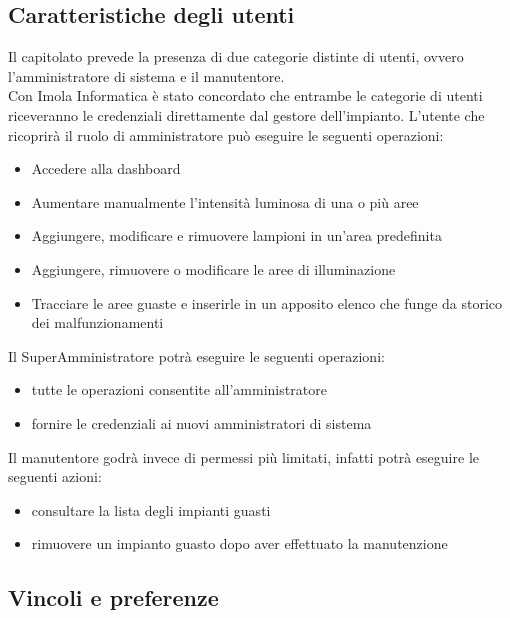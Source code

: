 \documentclass[12pt]{article}
\begin{document}
\subsection{Caratteristiche degli utenti}
Il capitolato prevede la presenza di due categorie distinte di utenti, ovvero l'amministratore di sistema e il manutentore. \\
Con Imola Informatica è stato concordato che entrambe le categorie di utenti riceveranno le credenziali direttamente dal gestore dell'impianto.
L'utente che ricoprirà il ruolo di amministratore può eseguire le seguenti operazioni:
\begin{itemize}
	\item Accedere alla dashboard
	\item Aumentare manualmente l'intensità luminosa di una o più aree
	\item Aggiungere, modificare e rimuovere lampioni in un'area predefinita
	\item Aggiungere, rimuovere o modificare le aree di illuminazione
	\item Tracciare le aree guaste e inserirle in un apposito elenco che funge da storico dei malfunzionamenti
\end{itemize}
Il SuperAmministratore potrà eseguire le seguenti operazioni:
\begin{itemize}
	\item tutte le operazioni consentite all'amministratore
	\item fornire le credenziali ai nuovi amministratori di sistema
\end{itemize}
Il manutentore godrà invece di permessi più limitati, infatti potrà eseguire le seguenti azioni:
\begin{itemize}
	\item consultare la lista degli impianti guasti
	\item rimuovere un impianto guasto dopo aver effettuato la manutenzione
\end{itemize}
\subsection{Vincoli e preferenze}
\end{document}
